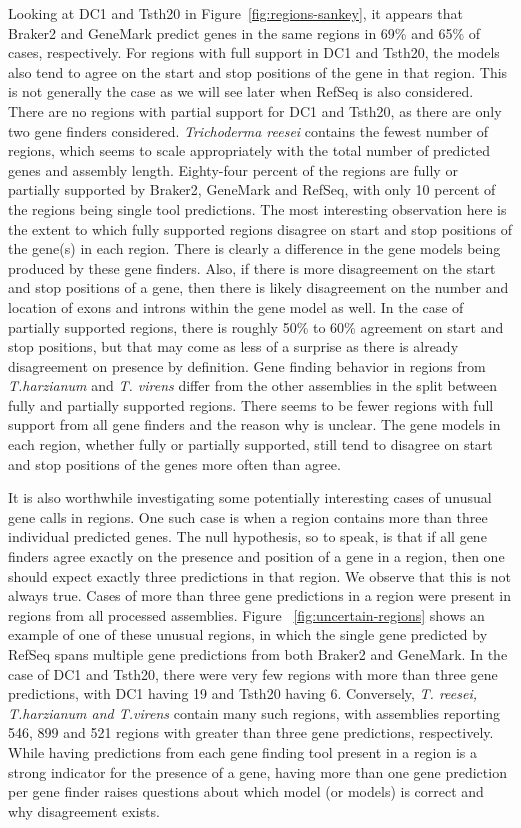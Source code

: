 Looking at DC1 and Tsth20 in Figure~\ref{fig:regions-sankey}, it
appears that Braker2 and GeneMark predict genes in the same regions in
69\% and 65\% of cases, respectively. For regions with full
support in DC1 and Tsth20, the models also tend to agree on the start
and stop positions of the gene in that region. This is not generally
the case as we will see later when RefSeq is also considered. There
are no regions with partial support for DC1 and Tsth20, as there are
only two gene finders considered. \textit{Trichoderma reesei} contains
the fewest number of regions, which seems to scale appropriately with
the total number of predicted genes and assembly length. Eighty-four
percent of the regions are fully or partially supported by Braker2,
GeneMark and RefSeq, with only 10 percent of the regions being single
tool predictions. The most interesting observation here is the extent
to which fully supported regions disagree on start and stop positions
of the gene(s) in each region. There is clearly a difference in the
gene models being produced by these gene finders. Also, if there is
more disagreement on the start and stop positions of a gene, then
there is likely disagreement on the number and location of exons and
introns within the gene model as well. In the case of partially
supported regions, there is roughly 50\% to 60\% agreement on start
and stop positions, but that may come as less of a surprise as there
is already disagreement on presence by definition. Gene finding
behavior in regions from \textit{T.harzianum} and \textit{T. virens}
differ from the other assemblies in the split between fully and
partially supported regions. There seems to be fewer regions with full
support from all gene finders and the reason why is unclear. The gene
models in each region, whether fully or partially supported, still
tend to disagree on start and stop positions of the genes more often
than agree.

It is also worthwhile investigating some potentially interesting cases
of unusual gene calls in regions. One such case is when a region
contains more than three individual predicted genes. The null
hypothesis, so to speak, is that if all gene finders agree exactly on
the presence and position of a gene in a region, then one should
expect exactly three predictions in that region. We observe that this
is not always true. Cases of more than three gene predictions in a
region were present in regions from all processed assemblies. Figure
~\ref{fig:uncertain-regions} shows an example of one of these unusual regions,
in which the single gene predicted by RefSeq spans multiple gene
predictions from both Braker2 and GeneMark. In the case of DC1 and
Tsth20, there were very few regions with more than three gene predictions, with DC1 having 19 and Tsth20 having 6. Conversely, \textit{T. reesei, T.harzianum and T.virens}
contain many such regions, with assemblies reporting 546, 899 and 521
regions with greater than three gene predictions, respectively. While
having predictions from each gene finding tool present in a region is
a strong indicator for the presence of a gene, having more than one
gene prediction per gene finder raises questions about which model (or
models) is correct and why disagreement exists.

